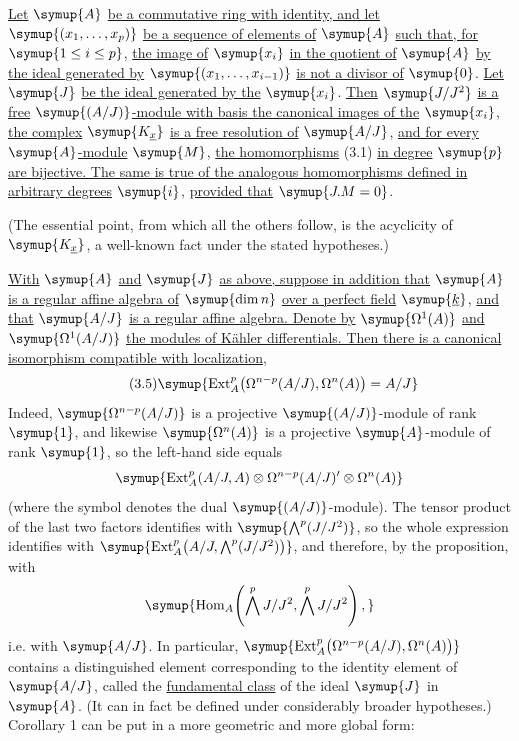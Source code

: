  \uline{Let} $\symup{A}$ \uline{be a commutative ring with identity, and let}
$\symup{(x_1,\ldots,x_p)}$ \uline{be a sequence of elements of} $\symup{A}$ \uline{such that, for}
$\symup{1\leq i\leq p}$, \uline{the image of} $\symup{x_i}$ \uline{in the quotient of} $\symup{A}$ \uline{by the ideal
generated by} $\symup{(x_1,\ldots,x_{i-1})}$ \uline{is not a divisor of} $\symup{0}$. \uline{Let} $\symup{J}$ \uline{be the ideal
generated by the} $\symup{x_i}$. \uline{Then} $\symup{J/J^{2}}$ \uline{is a free} $\symup{(A/J)}$\uline{-module with basis the
canonical images of the} $\symup{x_i}$, \uline{the complex} $\symup{K_{\underline{x}}}$ \uline{is a free
resolution of} $\symup{A/J}$, \uline{and for every} $\symup{A}$\uline{-module} $\symup{M}$, \uline{the homomorphisms} (3.1) \uline{in
degree} $\symup{p}$ \uline{are bijective. The same is true of the analogous homomorphisms
defined in arbitrary degrees} $\symup{i}$, \uline{provided that} $\symup{J.M=0}$.

(The essential point, from which all the others follow, is the acyclicity of
$\symup{K_{\underline{x}}}$, a well-known fact under the stated hypotheses.)

 \uline{With} $\symup{A}$ \uline{and} $\symup{J}$ \uline{as above, suppose in addition that} $\symup{A}$
\uline{is a regular affine algebra of} $\symup{\dim n}$ \uline{over a perfect field} $\symup{\underline{k}}$, \uline{and that}
$\symup{A/J}$ \uline{is a regular affine algebra. Denote by} $\symup{\Omega^{1}(A)}$ \uline{and}
$\symup{\Omega^{1}(A/J)}$ \uline{the modules of Kähler differentials. Then there is a canonical
isomorphism compatible with localization},
\begin{equation}\tag{3.5}
  \symup{\operatorname{Ext}_{A}^{p}\bigl(\Omega^{n-p}(A/J),\Omega^{n}(A)\bigr)=A/J}
\end{equation}
Indeed, $\symup{\Omega^{n-p}(A/J)}$ is a projective $\symup{(A/J)}$-module of rank $\symup{1}$, and likewise
$\symup{\Omega^{n}(A)}$ is a projective $\symup{A}$-module of rank $\symup{1}$, so the left-hand
side equals
\[
  \symup{\operatorname{Ext}_{A}^{p}(A/J,A)
  \otimes\Omega^{n-p}(A/J)'\otimes\Omega^{n}(A)}
\]
(where the symbol \fquote{$\symup{\prime}$} denotes the dual $\symup{(A/J)}$-module). The tensor product of the
last two factors identifies with $\symup{\bigwedge^{p}(J/J^{2})}$, so the whole expression
identifies with
$\symup{\operatorname{Ext}_{A}^{p}\!\left(A/J,\bigwedge^{p}(J/J^{2})\right)}$,
and therefore, by the proposition, with
\[
  \symup{\operatorname{Hom}_{A}\!\left(\bigwedge^{p}J/J^{2},
  \bigwedge^{p}J/J^{2}\right),}
\]
i.e. with $\symup{A/J}$. In particular,
$\symup{\operatorname{Ext}_{A}^{p}\bigl(\Omega^{n-p}(A/J),\Omega^{n}(A)\bigr)}$ contains
a distinguished element corresponding to the identity element of $\symup{A/J}$, called
the \uline{fundamental class} of the ideal $\symup{J}$ in $\symup{A}$. (It can in fact be defined
under considerably broader hypotheses.) Corollary 1 can be put in a more
geometric and more global form:

